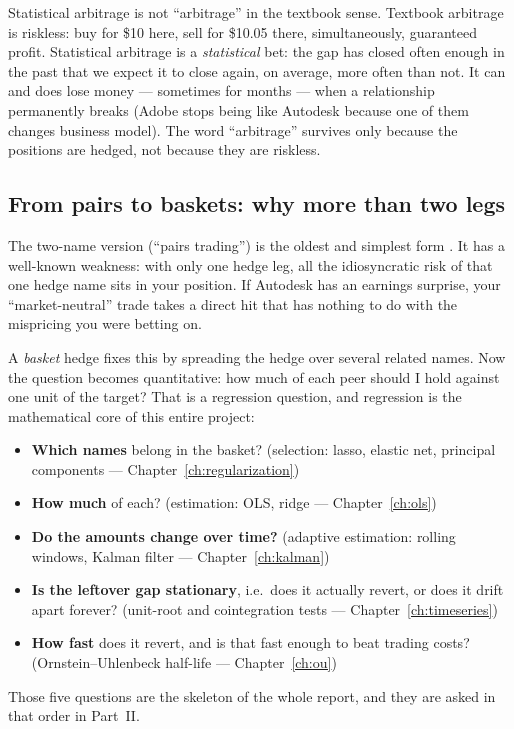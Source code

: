 \begin{intuition}
Statistical arbitrage is not ``arbitrage'' in the textbook sense. Textbook arbitrage is
riskless: buy for \$10 here, sell for \$10.05 there, simultaneously, guaranteed profit.
Statistical arbitrage is a \emph{statistical} bet: the gap has closed often enough in
the past that we expect it to close again, on average, more often than not. It can and
does lose money --- sometimes for months --- when a relationship permanently breaks
(Adobe stops being like Autodesk because one of them changes business model). The word
``arbitrage'' survives only because the positions are hedged, not because they are
riskless.
\end{intuition}

\subsection{From pairs to baskets: why more than two legs}
\label{sec:saa:baskets}

The two-name version (``pairs trading'') is the oldest and simplest form
\cite{gatev2006pairs}. It has a well-known weakness: with only one hedge leg, all the
idiosyncratic risk of that one hedge name sits in your position. If Autodesk has an
earnings surprise, your ``market-neutral'' trade takes a direct hit that has nothing to
do with the mispricing you were betting on.

A \emph{basket} hedge fixes this by spreading the hedge over several related names. Now
the question becomes quantitative: how much of each peer should I hold against one unit
of the target? That is a regression question, and regression is the mathematical core
of this entire project:
\begin{itemize}
  \item \textbf{Which names} belong in the basket? (selection: lasso, elastic net,
    principal components --- Chapter~\ref{ch:regularization})
  \item \textbf{How much} of each? (estimation: OLS, ridge --- Chapter~\ref{ch:ols})
  \item \textbf{Do the amounts change over time?} (adaptive estimation: rolling windows,
    Kalman filter --- Chapter~\ref{ch:kalman})
  \item \textbf{Is the leftover gap stationary}, i.e.\ does it actually revert, or does
    it drift apart forever? (unit-root and cointegration tests ---
    Chapter~\ref{ch:timeseries})
  \item \textbf{How fast} does it revert, and is that fast enough to beat trading costs?
    (Ornstein--Uhlenbeck half-life --- Chapter~\ref{ch:ou})
\end{itemize}
Those five questions are the skeleton of the whole report, and they are asked in that
order in Part~II.

